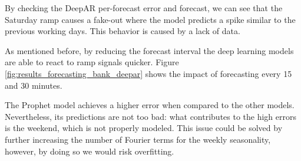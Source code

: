\documentclass[a4paper, 12pt]{article} %
\begin{document}
	By checking the DeepAR per-forecast error and forecast, we can see that the Saturday ramp causes a fake-out where the model predicts a spike similar to the previous working days. This behavior is caused by a lack of data.
	
	As mentioned before, by reducing the forecast interval the deep learning models are able to react to ramp signals quicker. Figure \ref{fig:results_forecasting_bank_deepar} shows the impact of forecasting every 15 and 30 minutes.
	
	The Prophet model achieves a higher error when compared to the other models. Nevertheless, its predictions are not too bad: what contributes to the high errors is the weekend, which is not properly modeled. This issue could be solved by further increasing the number of Fourier terms for the weekly seasonality, however, by doing so we would risk overfitting.
	
\end{document}
